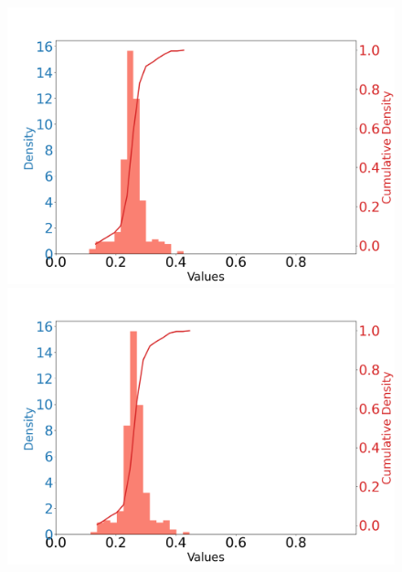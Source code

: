 \documentclass{article}
\begin{document}
\begin{figure}[htbp]
\begin{minipage}{0.195\textwidth}
    \end{minipage}
    \begin{minipage}{0.195\textwidth}
    \centering
    \includegraphics[scale=0.08]{figures/pass_density_idx_150_XCoord:-91.73_YCoord:7.29.png}
    \end{minipage}
    \begin{minipage}{0.195\textwidth}
    \centering
    \includegraphics[scale=0.08]{figures/pass_density_idx_180_XCoord:-72.11_YCoord:0.75.png}
    \end{minipage}
    \begin{minipage}{0.195\textwidth}
    \centering

\end{minipage}
\end{figure}
\end{document}
